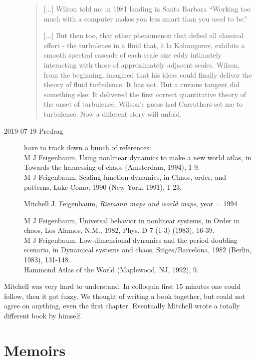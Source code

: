 \begin{description}
\begin{quote}
[...]
Wilson told me in 1981 landing in Santa Barbara ``Working too much with a
computer makes you less smart than you used to be.''

[...]
But then too, that other phenomenon that defied all classical effort -
the turbulence in a fluid that, à la Kolmogorov, exhibits a smooth
spectral cascade of each scale size eddy intimately interacting with
those of approximately adjacent scales. Wilson, from the beginning,
imagined that his ideas could finally deliver the theory of fluid
turbulence. It has not. But a curious tangent did something else: It
delivered the first correct quantitative theory of the onset of
turbulence. Wilson’s guess had Carruthers set me to turbulence. Now a
different story will unfold.

\end{quote}

\item[2019-07-19 Predrag]
have to track down a bunch of references:\\
 M J Feigenbaum, Using nonlinear dynamics to make a new world atlas, in Towards the harnessing of chaos (Amsterdam, 1994), 1-9.
\\
M J Feigenbaum, Scaling function dynamics, in Chaos, order, and patterns, Lake Como, 1990 (New York, 1991), 1-23.

{Mitchell J. Feigenbaum},
{\em Riemann maps and world maps},
  year      = {1994}

M J Feigenbaum, Universal behavior in nonlinear systems, in Order in chaos, Los Alamos, N.M., 1982, Phys. D 7 (1-3) (1983), 16-39.
\\
M J Feigenbaum, Low-dimensional dynamics and the period doubling scenario, in Dynamical systems and chaos, Sitges/Barcelona, 1982 (Berlin, 1983), 131-148.
\\
Hammond Atlas of the World (Maplewood, NJ, 1992), 9.

\end{description}


Mitchell was very hard to understand. In colloquia first 15 minutes one
could follow, then it got fuzzy. We thought of writing a book together,
but could not agree on anything, even the first chapter. Eventually
Mitchell wrote a totally different book by himself.

\section{Memoirs}
\label{sect:Memoirs}

